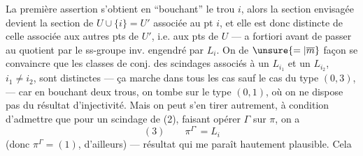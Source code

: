 La première assertion s'obtient en ``bouchant'' le trou $i$, alors la section envisagée devient la section de $U\cup\{i\}=U'$ associée au pt $i$, et elle est donc distincte de celle associée aux  autres pts de $U'$, i.e. aux pts de $U$ --- a fortiori avant de passer au quotient par le ss-groupe inv. engendré par $L_i$. On  de $\unsure{=|\overline m}$ façon se convaincre que les classes de conj. des scindages associés à un $L_{i_1}$ et un $L_{i_2}$, $i_1\ne i_2$, sont distinctes --- ça marche dans tous les cas sauf le cas du type $(0,3)$, --- car en bouchant deux trous, on tombe sur le type $(0,1)$, où on ne dispose pas du résultat d'injectivité. Mais on peut s'en tirer autrement, à condition d'admettre que pour un scindage de (2), faisant opérer $\Gamma$ sur $\pi$, on a
\[
(3)\qquad\pi^{\Gamma^\circ}=L_i
\]
(donc $\pi^\Gamma=(1)$, d'ailleurs) --- résultat qui me paraît hautement plausible. Cela
